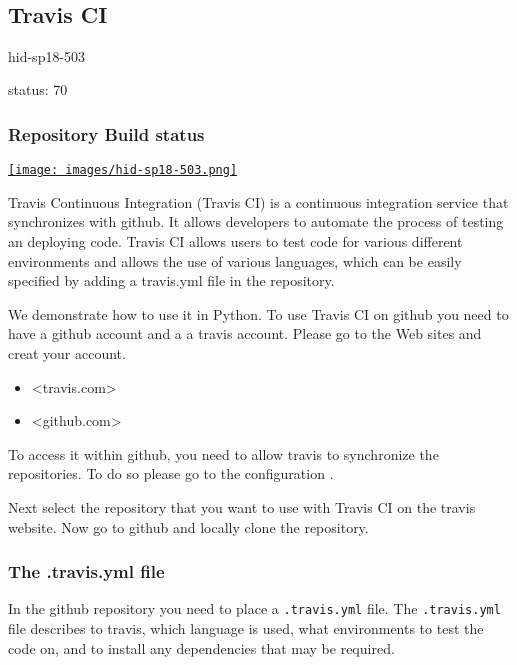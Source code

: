 \MDNAME\

\subsection{Travis CI}

hid-sp18-503

status: 70

\subsubsection{Repository Build status}

\href{https://travis-ci.org/seashiva94/hid-sp18-503}{\texttt{[image: images/hid-sp18-503.png]}}

Travis Continuous Integration (Travis CI) is a continuous integration
service that synchronizes with github. It allows developers to automate
the process of testing an deploying code. Travis CI allows users to test
code for various different environments and allows the use of various
languages, which can be easily specified by adding a travis.yml file in
the repository.

We demonstrate how to use it in Python. To use Travis CI on github you
need to have a github account and a a travis account. Please go to the
Web sites and creat your account.

\begin{itemize}
\item
  \textless{}travis.com\textgreater{}
\item
  \textless{}github.com\textgreater{}
\end{itemize}

To access it within github, you need to allow travis to synchronize the
repositories. To do so please go to the configuration .

Next select the repository that you want to use with Travis CI on the
travis website. Now go to github and locally clone the repository.

\subsubsection{The .travis.yml file}

In the github repository you need to place a \texttt{.travis.yml} file.
The \texttt{.travis.yml} file describes to travis, which language is
used, what environments to test the code on, and to install any
dependencies that may be required.

